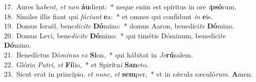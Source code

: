 {17.~}Aures ha\textit{bent}, \textit{et} \textit{non} \textbf{áu}dient:~* neque enim est spíritus in ore \textit{i}\textbf{psó}rum.\\
{18.~}Símiles illis fiant qui \textit{fá}\textit{ci}\textit{unt} \textbf{e}a:~* et omnes qui confídunt \textit{in} \textbf{e}is.\\
{19.~}Domus Israël, bene\textit{dí}\textit{ci}\textit{te} \textbf{Dó}mino:~* domus Aaron, benedíci\textit{te} \textbf{Dó}mino.\\
{20.~}Domus Levi, bene\textit{dí}\textit{ci}\textit{te} \textbf{Dó}mino:~* qui timétis Dóminum, benedíci\textit{te} \textbf{Dó}mino.\\
{21.~}Benedíctus Dó\textit{mi}\textit{nus} \textit{ex} \textbf{Si}on,~* qui hábitat in \textit{Je}\textbf{rú}salem.\\
{22.~}Glória \textit{Pa}\textit{tri}, \textit{et} \textbf{Fí}lio,~* et Spirítu\textit{i} \textbf{San}cto.\\
{23.~}Sicut erat in princípio, \textit{et} \textit{nunc}, \textit{et} \textbf{sem}per,~* et in sǽcula sæculó\textit{rum}. \textbf{A}men.\\
